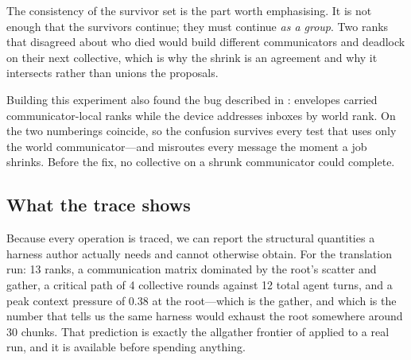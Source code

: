 The consistency of the survivor set is the part worth emphasising. It is not
enough that the survivors continue; they must continue \emph{as a group}. Two
ranks that disagreed about who died would build different communicators and
deadlock on their next collective, which is why the shrink is an agreement
and why it intersects rather than unions the proposals.

Building this experiment also found the bug described in
: envelopes carried communicator-local ranks while the device
addresses inboxes by world rank. On  the two numberings
coincide, so the confusion survives every test that uses only the world
communicator---and misroutes every message the moment a job shrinks. Before
the fix, no collective on a shrunk communicator could complete.

\subsection{What the trace shows}

Because every operation is traced, we can report the structural quantities a
harness author actually needs and cannot otherwise obtain. For the
translation run: 13 ranks, a communication matrix dominated by the root's
scatter and gather, a critical path of 4 collective rounds against 12 total
agent turns, and a peak context pressure of 0.38 at the root---which is the
gather, and which is the number that tells us the same harness would exhaust
the root somewhere around 30 chunks. That prediction is exactly the
allgather frontier of  applied to a real run, and it is
available before spending anything.
